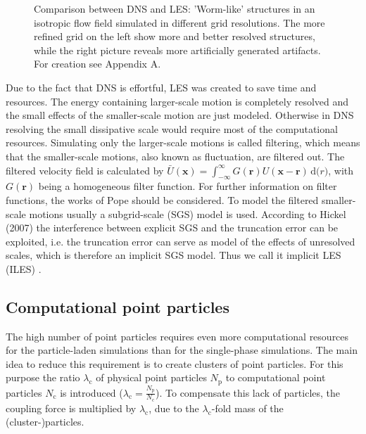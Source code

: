\documentclass[11pt,a4paper,openany,oneside,parskip=half*]{article}
\renewcommand*\vec[1]{\boldsymbol{#1}}
\begin{document}
\begin{figure}[h]
\begin{minipage}[t]{0.5\textwidth}
        \label{64_velocity}
    \end{minipage}
    \captionsetup{width=0.97\linewidth}
\caption{Comparison between DNS and LES: 'Worm-like' structures in an isotropic flow field simulated in different grid resolutions. The more refined grid on the left show more and better resolved structures, while the right picture reveals more artificially generated artifacts. For creation see Appendix A.}
\end{figure}
Due to the fact that DNS is effortful, LES was created to save time and resources. The energy containing larger-scale motion is completely resolved and the small effects of the smaller-scale motion are just modeled. Otherwise in DNS resolving the small dissipative scale would require most of the computational resources.
\newline%
Simulating only the larger-scale motions is called filtering, which means that the smaller-scale motions, also known as fluctuation, are filtered out. The filtered velocity field is calculated by $\bar U(\vec{x}) = \int_{-\infty}^{\infty} G(\vec{r})U(\vec{x} - \vec{r})  \, \mathrm{d}\vec(r)$, with $G(\vec{r}) $ being a homogeneous filter function. For further information on filter functions, the works of Pope \cite{turbulentFlows} should be considered. To model the filtered smaller-scale motions usually a subgrid-scale (SGS) model is used. According to Hickel (2007) the interference between explicit SGS and the truncation error can be exploited, i.e. the truncation error can serve as model of the effects of unresolved scales, which is therefore an implicit SGS model. Thus we call it implicit LES (ILES) \cite{implicitLES}. %
\subsection{Computational point particles}
The high number of point particles requires even more computational resources for the particle-laden simulations than for the single-phase simulations. The main idea to reduce this requirement is to create clusters of point particles. For this purpose the ratio $\lambda_\mathrm{c}$ of physical point particles $N_\mathrm{p}$ to computational point particles $N_\mathrm{c}$ is introduced ($\lambda_\mathrm{c} = \frac{N_\mathrm{p}}{N_\mathrm{c}}$). To compensate this lack of particles, the coupling force is multiplied by $\lambda_\mathrm{c}$, due to the $\lambda_\mathrm{c}$-fold mass of the (cluster-)particles.
\newline
\end{document}
